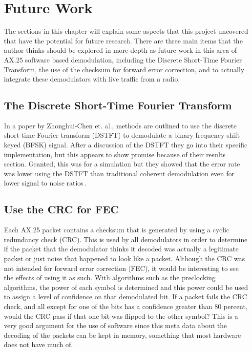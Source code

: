 \chapter{Future Work}
The sections in this chapter will explain some aspects that this project uncovered that have the potential for future research. There are three main items that the author thinks should be explored in more depth as future work in this area of AX.25 software based demodulation, including the Discrete Short-Time Fourier Transform, the use of the checksum for forward error correction, and to actually integrate these demodulators with live traffic from a radio.

\section{The Discrete Short-Time Fourier Transform}
In a paper by Zhonghui-Chen et. al., methods are outlined to use the discrete short-time Fourier transform (DSTFT) to demodulate a binary frequency shift keyed (BFSK) signal. After a discussion of the DSTFT they go into their specific implementation, but this appears to show promise because of their results section. Granted, this was for a simulation but they showed that the error rate was lower using the DSTFT than traditional coherent demodulation even for lower signal to noise ratios\,\cite{Chen2008}.

\section{Use the CRC for FEC}
Each AX.25 packet contains a checksum that is generated by using a cyclic redundancy check (CRC). This is used by all demodulators in order to determine if the packet that the demodulator thinks it decoded was actually a legitimate packet or just noise that happened to look like a packet. Although the CRC was not intended for forward error correction (FEC), it would be interesting to see the effects of using it as such. With algorithms such as the preclocking algorithms, the power of each symbol is determined and this power could be used to assign a level of confidence on that demodulated bit. If a packet fails the CRC check, and all except for one of the bits has a confidence greater than 80 percent, would the CRC pass if that one bit was flipped to the other symbol? This is a very good argument for the use of software since this meta data about the decoding of the packets can be kept in memory, something that most hardware does not have much of. 

